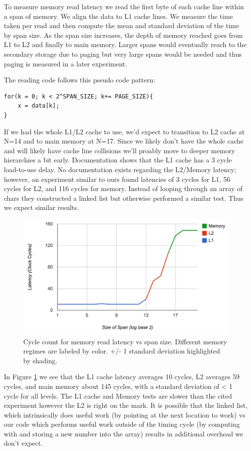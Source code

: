 To measure memory read latency we read the first byte of each cache line within a span of memory.  
We align the data to L1 cache lines.
We measure the time taken per read and then compute the mean and standard deviation of the time by span size.
As the span size increases, the depth of memory reached goes from L1 to L2 and finally to main memory.  
Larger spans would eventually reach to the secondary storage due to paging but very large spans would be needed and thus paging is measured in a later experiment.

The reading code follows this pseudo code pattern:
\begin{verbatim}
for(k = 0; k < 2^SPAN_SIZE; k+= PAGE_SIZE){
	x = data[k];
}
\end{verbatim}

If we had the whole L1/L2 cache to use, we'd expect to transition to L2 cache at N=14 and to main memory at N=17.
Since we likely don't have the whole cache and will likely have cache line collisions we'll proably move to deeper memory hierarchies a bit early.
Documentation shows that the L1 cache has a 3 cycle load-to-use delay.  
No documentation exists regarding the L2/Memory latency; however, an experiment similar to ours found latencies of 3 cycles for L1, 56 cycles for L2, and 116 cycles for memory\cite{sandmem}.
Instead of looping through an array of chars they constructed a linked list but otherwise performed a similar test.
Thus we expect similar results.

\begin{figure}[h]
\label{fig:exp_2_1}
\centering
\includegraphics[scale=.5]{experiments/exp_2_1_fig.png}
\caption{Cycle count for memory read latency vs span size.  
Different memory regimes are labeled by color.  +/- 1 standard deviation highlighted by shading.}
\end{figure}

In Figure \ref{fig:exp_2_1} we see that the L1 cache latency averages 10 cycles, L2 averages 59 cycles, and main memory about 145 cycles, with a standard deviation of < 1 cycle for all levels. 
The L1 cache and Memory tests are slower than the cited experiment however the L2 is right on the mark.
It is possible that the linked list, which intrinsically does useful work (by pointing at the next location to work) vs our code which performs useful work outside of the timing cycle (by computing with and storing a new number into the array) results in additional overhead we don't expect.  

